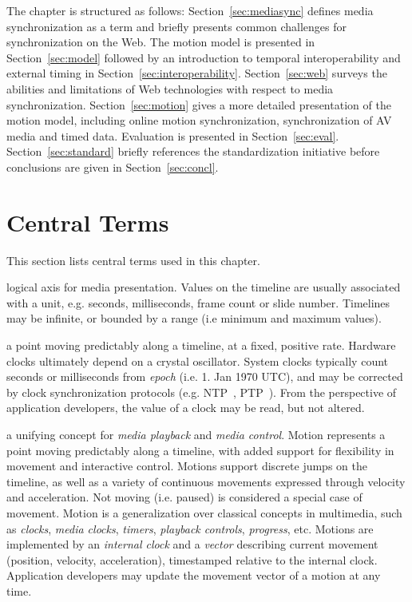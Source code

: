 \documentclass[graybox]{svmult}
\begin{document}
The chapter is structured as follows: Section~\ref{sec:mediasync} defines media
synchronization as a term and briefly presents common challenges for
synchronization on the Web. The motion model is presented in
Section~\ref{sec:model} followed by an introduction to temporal interoperability
and external timing in Section~\ref{sec:interoperability}. Section~\ref{sec:web} surveys the abilities and limitations of Web technologies with respect to media synchronization.
Section~\ref{sec:motion} gives a more detailed presentation of the motion model, including online motion synchronization, synchronization of AV media and timed data. Evaluation is presented in Section~\ref{sec:eval}.
Section~\ref{sec:standard} briefly references the standardization initiative before
conclusions are given in Section~\ref{sec:concl}.

\section{Central Terms}
\label{sec:terms}
This section lists central terms used in this chapter.


logical axis for media presentation. Values on the timeline are usually
associated with a unit, e.g. seconds, milliseconds, frame count or slide
number. Timelines may be infinite, or bounded by a range (i.e minimum and
maximum values).


a point moving predictably along a timeline, at a fixed, positive rate.
Hardware clocks ultimately depend on a crystal oscillator. System clocks
typically count seconds or milliseconds from \emph{epoch} (i.e. 1. Jan 1970
UTC), and may be corrected by clock synchronization protocols (e.g.
NTP~\cite{ntp}, PTP~\cite{ptp}). From the perspective of application
developers, the value of a clock may be read, but not altered.


a unifying concept for \emph{media playback} and \emph{media control}. Motion
represents a point moving predictably along a timeline, with added support for
flexibility in movement and interactive control. Motions support discrete
jumps on the timeline, as well as a variety of continuous movements expressed
through velocity and acceleration. Not moving (i.e. paused) is considered a
special case of movement. Motion is a generalization over classical concepts
in multimedia, such as \emph{clocks}, \emph{media clocks}, \emph{timers},
\emph{playback controls}, \emph{progress}, etc. Motions are implemented by an
\emph{internal clock} and a \emph{vector} describing current movement (position,
velocity, acceleration), timestamped relative to the internal clock.
Application developers may update the movement vector of a motion at any time.
\end{document}
